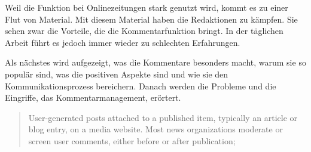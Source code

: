 Weil die Funktion bei Onlinezeitungen stark genutzt wird, kommt es zu einer Flut
von Material. Mit diesem Material haben die Redaktionen zu kämpfen. Sie sehen
zwar die Vorteile, die die Kommentarfunktion bringt. In der täglichen Arbeit
führt es jedoch immer wieder zu schlechten Erfahrungen.

Als nächstes wird aufgezeigt, was die Kommentare besonders macht, warum sie so
populär sind, was die positiven Aspekte sind und wie sie den
Kommunikationsprozess bereichern. Danach werden die Probleme und die Eingriffe,
das Kommentarmanagement, erörtert.

\begin{quote}
User-generated posts attached to a published item, typically an article or blog
entry, on a media website. Most news organizations moderate or screen user
comments, either before or after publication;
\autocite[S.~204, Glossar]{participatory}
\end{quote}

